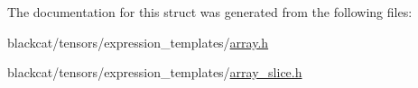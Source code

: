 The documentation for this struct was generated from the following files\+:\begin{DoxyCompactItemize}
\item 
blackcat/tensors/expression\+\_\+templates/\hyperlink{array_8h}{array.\+h}\item 
blackcat/tensors/expression\+\_\+templates/\hyperlink{array__slice_8h}{array\+\_\+slice.\+h}\end{DoxyCompactItemize}
